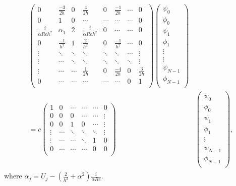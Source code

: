 \documentclass[a4paper, 12pt, twoside, openright]{article}
\numberwithin{equation}{section}
\begin{document}
\begin{align}
\begin{split}
\begin{pmatrix}
0 & \frac{-3}{2h} & 0 & \frac{4}{2h} & 0 & \frac{-1}{2h} & \cdots & 0 \\
0 & 1 & 0 & \cdots & \cdots & \cdots & \cdots & 0 \\
\frac{i}{\alpha Re h^2} & \alpha_1 & 2 & \frac{i}{\alpha Re h^2} & 0 & \cdots & \cdots & 0 \\
0 & \frac{-1}{h^2} & 1 & \frac{2}{h^2} & 0 &\frac{-1}{h^2} &  \cdots & 0\\
\vdots & \ddots & \ddots & \ddots & \ddots & \ddots & \cdots & \vdots \\ 
\vdots & \cdots & \ddots & \ddots & \ddots & \ddots & \ddots & \vdots \\ 
\vdots & \cdots & \cdots & \frac{1}{2h} & 0 & \frac{-4}{2h} & 0 & \frac{3}{2h} \\
0 & \cdots & \cdots & \cdots &\cdots & \cdots & 0 & 1 \\
\end{pmatrix} 
\begin{pmatrix}
\psi_0 \\
\phi_0 \\
\psi_1 \\
\phi_1 \\
\vdots \\
\vdots \\
\psi_{N-1} \\
\phi_{N-1} \\ 
\end{pmatrix}
\\= c
\begin{pmatrix}
1 & 0 & \cdots & \cdots & \cdots & 0 \\
0 & 0 & 0 & \cdots & \cdots & \vdots \\
0 & 0  & 1 & 0 & \cdots & \vdots \\
\vdots & \cdots & \ddots & \ddots & \ddots & \vdots \\
\vdots & \cdots & \cdots & \ddots & 1 & 0 \\
0 & \cdots & \cdots & \cdots & 0 & 0 \\
\end{pmatrix}
&
\begin{pmatrix}
\psi_0 \\
\phi_0 \\
\psi_1 \\
\phi_1 \\
\vdots \\
\psi_{N-1} \\
\phi_{N-1} \\ 
\end{pmatrix},
\end{split}
\end{align}
where $\alpha_j = U_j - \left( \frac{2}{h^2}+\alpha^2 \right)\frac{i}{\alpha Re}$. 
\end{document}
